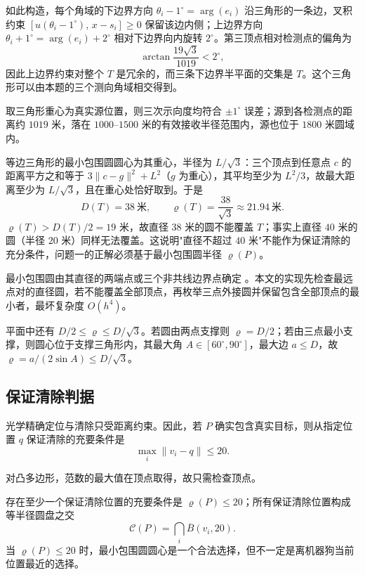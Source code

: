 \documentclass[UTF8,a4paper,zihao=-4,fontset=none]{ctexart}
\begin{document}
如此构造，每个角域的下边界方向 $\theta_i-1^\circ=\arg(e_i)$ 沿三角形的一条边，叉积约束 $[u(\theta_i-1^\circ),\,x-s_i]\ge0$ 保留该边内侧；上边界方向 $\theta_i+1^\circ=\arg(e_i)+2^\circ$ 相对下边界向内旋转 $2^\circ$。第三顶点相对检测点的偏角为
\begin{equation}
  \arctan\frac{19\sqrt3}{1019}<2^\circ,
\end{equation}
因此上边界约束对整个 $T$ 是冗余的，而三条下边界半平面的交集是 $T$。这个三角形可以由本题的三个测向角域相交得到。

取三角形重心为真实源位置，则三次示向度均符合 $\pm1^\circ$ 误差；源到各检测点的距离约 $1019$ 米，落在 $1000$--$1500$ 米的有效接收半径范围内，源也位于 $1800$ 米圆域内。

等边三角形的最小包围圆圆心为其重心，半径为 $L/\sqrt3$：三个顶点到任意点 $c$ 的距离平方之和等于 $3\lVert c-g\rVert^2+L^2$（$g$ 为重心），其平均至少为 $L^2/3$，故最大距离至少为 $L/\sqrt3$，且在重心处恰好取到。于是
\begin{equation}
  D(T)=38\ \text{米},\qquad \varrho(T)=\frac{38}{\sqrt3}\approx21.94\ \text{米}.
  \label{eq:counterexample}
\end{equation}
$\varrho(T)>D(T)/2=19$ 米，故直径 $38$ 米的圆不能覆盖 $T$；事实上直径 $40$ 米的圆（半径 $20$ 米）同样无法覆盖。这说明"直径不超过 $40$ 米"不能作为保证清除的充分条件，问题一的正解必须基于最小包围圆半径 $\varrho(P)$。

最小包围圆由其直径的两端点或三个非共线边界点确定 \cite{Welzl1991}。本文的实现先检查最远点对的直径圆，若不能覆盖全部顶点，再枚举三点外接圆并保留包含全部顶点的最小者，最坏复杂度 $O(h^4)$。

平面中还有 $D/2\le\varrho\le D/\sqrt3$。若圆由两点支撑则 $\varrho=D/2$；若由三点最小支撑，则圆心位于支撑三角形内，其最大角 $A\in[60^\circ,90^\circ]$，最大边 $a\le D$，故 $\varrho=a/(2\sin A)\le D/\sqrt3$。

\subsection{保证清除判据}

光学精确定位与清除只受距离约束。因此，若 $P$ 确实包含真实目标，则从指定位置 $q$ 保证清除的充要条件是
\begin{equation}
  \max_i\lVert v_i-q\rVert\le20 .
  \label{eq:clear-condition}
\end{equation}

对凸多边形，范数的最大值在顶点取得，故只需检查顶点。

存在至少一个保证清除位置的充要条件是 $\varrho(P)\le20$；所有保证清除位置构成等半径圆盘之交
\begin{equation}
  \mathcal{C}(P)=\bigcap_i\overline{B}(v_i,20).
  \label{eq:clear-set}
\end{equation}
当 $\varrho(P)\le20$ 时，最小包围圆圆心是一个合法选择，但不一定是离机器狗当前位置最近的选择。
\end{document}
